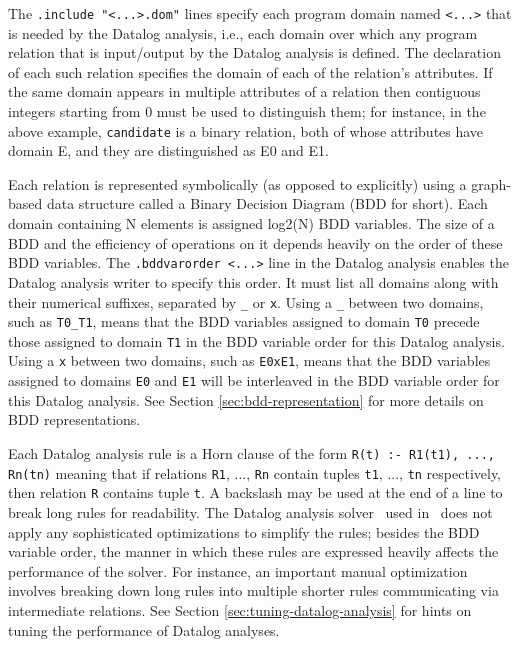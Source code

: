 The {\tt .include "<...>.dom"} lines specify each program domain named
{\tt <...>} that is needed by the Datalog analysis, i.e., each domain over which
any program relation that is input/output by the Datalog analysis is defined. 
The declaration of each such relation specifies the domain of each of the relation's attributes.
If the same domain appears in multiple attributes of a relation then
contiguous integers starting from 0 must be used to distinguish them; for instance,
in the above example, {\tt candidate} is a binary relation, both of whose
attributes have domain E, and they are distinguished as E0 and E1.

Each relation is represented symbolically (as opposed to explicitly)
using a graph-based data structure called a Binary Decision Diagram (BDD for short).
Each domain containing N elements is assigned log2(N) BDD variables.
The size of a BDD and the efficiency of operations on it depends heavily
on the order of these BDD variables.
The {\tt .bddvarorder <...>} line in the Datalog analysis enables the Datalog
analysis writer to specify this order.
It must list all domains along with their numerical suffixes, separated
by {\tt \_} or {\tt x}.
Using a {\tt \_} between two domains, such as {\tt T0\_T1}, means that the BDD variables assigned
to domain {\tt T0} precede those assigned to domain {\tt T1} in the BDD variable
order for this Datalog analysis.
Using a {\tt x} between two domains, such as {\tt E0xE1}, means that the
BDD variables assigned to domains {\tt E0} and {\tt E1}
will be interleaved in the BDD variable order for this Datalog analysis.
See Section \ref{sec:bdd-representation} for more details on BDD representations.

Each Datalog analysis rule is a Horn clause of the form
{\tt R(t) :- R1(t1), ..., Rn(tn)}
meaning that if relations {\tt R1}, ..., {\tt Rn} contain tuples {\tt t1}, ..., {\tt tn}
respectively, then relation {\tt R} contains tuple {\tt t}.
A backslash may be used at the end of a line to break long rules for readability.
The Datalog analysis solver \bddbddb\ used in \Chord\ does not apply any
sophisticated optimizations to simplify the rules; besides the BDD variable order,
the manner in which these rules are expressed heavily affects the performance of
the solver.  For instance, an important manual optimization involves breaking down
long rules into multiple shorter rules communicating via intermediate relations.
See Section \ref{sec:tuning-datalog-analysis} for hints on tuning the performance
of Datalog analyses.
